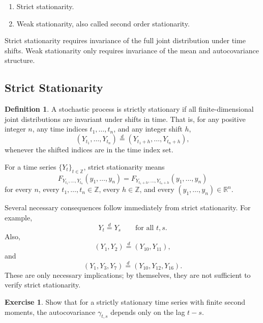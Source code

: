\documentclass[12pt,oneside]{book}
\numberwithin{equation}{section}
\theoremstyle{definition}
\newtheorem{definition}{Definition}[section]
\newtheorem{exercise}{Exercise}[section]
\theoremstyle{plain}
\theoremstyle{remark}
\newcommand{\R}{\mathbb{R}}
\newcommand{\Z}{\mathbb{Z}}
\begin{document}
\begin{enumerate}
\item Strict stationarity.
\item Weak stationarity, also called second order stationarity.
\end{enumerate}

Strict stationarity requires invariance of the full joint distribution under time shifts. Weak stationarity only requires invariance of the mean and autocovariance structure.

\subsection*{Strict Stationarity}

\begin{definition}
A stochastic process is strictly stationary if all finite-dimensional joint distributions are invariant under shifts in time. That is, for any positive integer $n$, any time indices $t_1,\ldots,t_n$, and any integer shift $h$,
\[
(Y_{t_1},\ldots,Y_{t_n})
\overset{d}{=}
(Y_{t_1+h},\ldots,Y_{t_n+h}),
\]
whenever the shifted indices are in the time index set.
\end{definition}

For a time series $\{Y_t\}_{t\in\Z}$, strict stationarity means
\[
F_{Y_{t_1},\ldots,Y_{t_n}}(y_1,\ldots,y_n)
=
F_{Y_{t_1+h},\ldots,Y_{t_n+h}}(y_1,\ldots,y_n)
\]
for every $n$, every $t_1,\ldots,t_n\in\Z$, every $h\in\Z$, and every $(y_1,\ldots,y_n)\in\R^n$.

Several necessary consequences follow immediately from strict stationarity. For example,
\[
Y_t \overset{d}{=} Y_s
\qquad
\text{for all } t,s.
\]
Also,
\[
(Y_1,Y_2)\overset{d}{=}(Y_{10},Y_{11}),
\]
and
\[
(Y_1,Y_3,Y_7)\overset{d}{=}(Y_{10},Y_{12},Y_{16}).
\]
These are only necessary implications; by themselves, they are not sufficient to verify strict stationarity.

\begin{exercise}
Show that for a strictly stationary time series with finite second moments, the autocovariance $\gamma_{t,s}$ depends only on the lag $t-s$.
\end{exercise}
\end{document}
